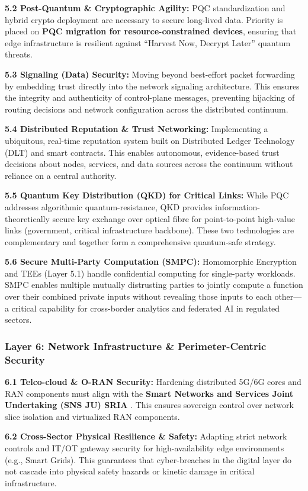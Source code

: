 \documentclass{ieeeaccess}
\begin{document}
\textbf{5.2 Post-Quantum \& Cryptographic Agility:} PQC standardization and hybrid crypto deployment are necessary to secure long-lived data. Priority is placed on \textbf{PQC migration for resource-constrained devices}, ensuring that edge infrastructure is resilient against ``Harvest Now, Decrypt Later'' quantum threats.

\textbf{5.3 Signaling (Data) Security:} Moving beyond best-effort packet forwarding by embedding trust directly into the network signaling architecture. This ensures the integrity and authenticity of control-plane messages, preventing hijacking of routing decisions and network configuration across the distributed continuum.

\textbf{5.4 Distributed Reputation \& Trust Networking:} Implementing a ubiquitous, real-time reputation system built on Distributed Ledger Technology (DLT) and smart contracts. This enables autonomous, evidence-based trust decisions about nodes, services, and data sources across the continuum without reliance on a central authority.

\textbf{5.5 Quantum Key Distribution (QKD) for Critical Links:} While PQC addresses algorithmic quantum-resistance, QKD provides information-theoretically secure key exchange over optical fibre for point-to-point high-value links (government, critical infrastructure backbone). These two technologies are complementary and together form a comprehensive quantum-safe strategy.

\textbf{5.6 Secure Multi-Party Computation (SMPC):} Homomorphic Encryption and TEEs (Layer 5.1) handle confidential computing for single-party workloads. SMPC enables multiple mutually distrusting parties to jointly compute a function over their combined private inputs without revealing those inputs to each other---a critical capability for cross-border analytics and federated AI in regulated sectors.

\subsubsection*{Layer 6: Network Infrastructure \& Perimeter-Centric Security}
\textbf{6.1 Telco-cloud \& O-RAN Security:} Hardening distributed 5G/6G cores and RAN components must align with the \textbf{Smart Networks and Services Joint Undertaking (SNS JU) SRIA} \cite{snsju}. This ensures sovereign control over network slice isolation and virtualized RAN components.

\textbf{6.2 Cross-Sector Physical Resilience \& Safety:} Adapting strict network controls and IT/OT gateway security for high-availability edge environments (e.g., Smart Grids). This guarantees that cyber-breaches in the digital layer do not cascade into physical safety hazards or kinetic damage in critical infrastructure.
\end{document}
